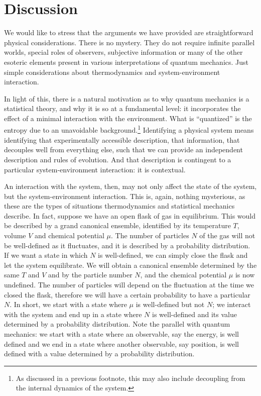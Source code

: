 \documentclass[10pt,twocolumn, nofootinbib]{revtex4-2}
\begin{document}
\section{Discussion}

We would like to stress that the arguments we have provided are straightforward physical considerations. There is no mystery. They do not require infinite parallel worlds, special roles of observers, subjective information or many of the other esoteric elements present in various interpretations of quantum mechanics. Just simple considerations about thermodynamics and system-environment interaction. 

In light of this, there is a natural motivation as to why quantum mechanics is a statistical theory, and why it is so at a fundamental level: it incorporates the effect of a minimal interaction with the environment. What is ``quantized'' is the entropy due to an unavoidable background.\footnote{As discussed in a previous footnote, this may also include decoupling from the internal dynamics of the system.} Identifying a physical system means identifying that experimentally accessible description, that information, that decouples well from everything else, such that we can provide an independent description and rules of evolution. And that description is contingent to a particular system-environment interaction: it is contextual.

An interaction with the system, then, may not only affect the state of the system, but the system-environment interaction. This is, again, nothing mysterious, as these are the types of situations thermodynamics and statistical mechanics describe. In fact, suppose we have an open flask of gas in equilibrium. This would be described by a grand canonical ensemble, identified by its temperature $T$, volume $V$ and chemical potential $\mu$. The number of particles $N$ of the gas will not be well-defined as it fluctuates, and it is described by a probability distribution. If we want a state in which $N$ is well-defined, we can simply close the flask and let the system equilibrate. We will obtain a canonical ensemble determined by the same $T$ and $V$ and by the particle number $N$, and the chemical potential $\mu$ is now undefined. The number of particles will depend on the fluctuation at the time we closed the flask, therefore we will have a certain probability to have a particular $N$. In short, we start with a state where $\mu$ is well-defined but not $N$; we interact with the system and end up in a state where $N$ is well-defined and its value determined by a probability distribution. Note the parallel with quantum mechanics: we start with a state where an observable, say the energy, is well defined and we end in a state where another observable, say position, is well defined with a value determined by a probability distribution.
\end{document}
